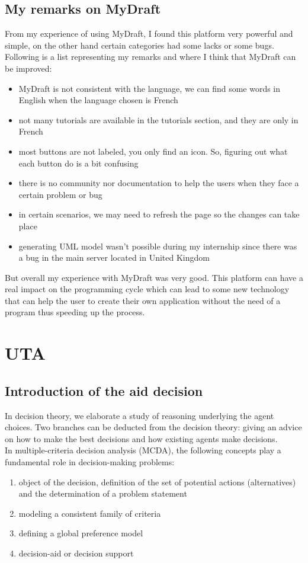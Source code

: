 \documentclass{report}
\begin{document}
\subsection{My remarks on MyDraft}
From my experience of using MyDraft, I found this platform very powerful and simple, on the other hand certain categories had some lacks or some bugs. Following is a list representing my remarks and where I think that MyDraft can be improved:
\begin{itemize}
\item MyDraft is not consistent with the language, we can find some words in English when the language chosen is French
\item not many tutorials are available in the tutorials section, and they are only in French
\item most buttons are not labeled, you only find an icon. So, figuring out what each button do is a bit confusing
\item there is no community nor documentation to help the users when they face a certain problem or bug
\item in certain scenarios, we may need to refresh the page so the changes can take place
\item generating UML model wasn't possible during my internship since there was a bug in the main server located in United Kingdom
\end{itemize}

But overall my experience with MyDraft was very good. This platform can have a real impact on the programming cycle which can lead to some new technology that can help the user to create their own application without the need of a program thus speeding up the process.

\section{UTA}
\subsection{Introduction of the aid decision}
In decision theory, we elaborate a study of reasoning underlying the agent choices. Two branches can be deducted from the decision theory: giving an advice on how to make the best decisions and how existing agents make decisions. \\
In multiple-criteria decision analysis (MCDA), the following concepts play a fundamental role in decision-making problems: 
\begin{enumerate}
\item object of the decision, definition of the set of potential actions (alternatives) and the determination of a problem statement
\item modeling a consistent family of criteria
\item defining a global preference model
\item decision-aid or decision support
\end{enumerate}
\end{document}
